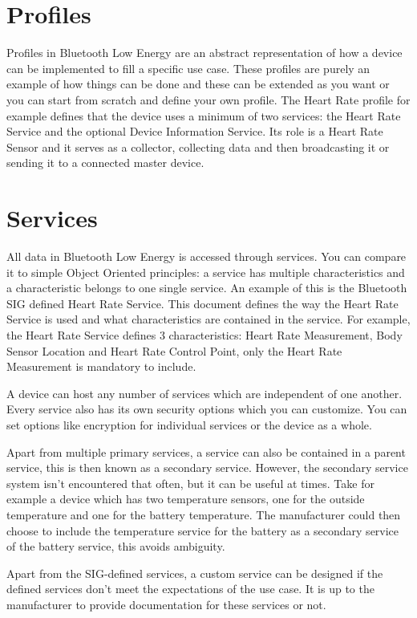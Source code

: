 \documentclass[pdftex,a4paper,12pt,twoside]{report}
\begin{document}
\section{Profiles}
\label{sec:profiles}
Profiles in Bluetooth Low Energy are an abstract representation of how a device can be implemented to fill a specific use case. These profiles are purely an example of how things can be done and these can be extended as you want or you can start from scratch and define your own profile. The Heart Rate profile for example defines that the device uses a minimum of two services: the Heart Rate Service and the optional Device Information Service. Its role is a Heart Rate Sensor and it serves as a collector, collecting data and then broadcasting it or sending it to a connected master device.

\section{Services}
\label{sec:services}
All data in Bluetooth Low Energy is accessed through services. You can compare it to simple Object Oriented principles: a service has multiple characteristics and a characteristic belongs to one single service. An example of this is the Bluetooth SIG defined Heart Rate Service. This document defines the way the Heart Rate Service is used and what characteristics are contained in the service. For example, the Heart Rate Service defines 3 characteristics: Heart Rate Measurement, Body Sensor Location and Heart Rate Control Point, only the Heart Rate Measurement is mandatory to include.

A device can host any number of services which are independent of one another. Every service also has its own security options which you can customize. You can set options like encryption for individual services or the device as a whole.

Apart from multiple primary services, a service can also be contained in a parent service, this is then known as a secondary service. However, the secondary service system isn't encountered that often, but it can be useful at times. Take for example a device which has two temperature sensors, one for the outside temperature and one for the battery temperature. The manufacturer could then choose to include the temperature service for the battery as a secondary service of the battery service, this avoids ambiguity.

Apart from the SIG-defined services, a custom service can be designed if the defined services don't meet the expectations of the use case. It is up to the manufacturer to provide documentation for these services or not.
\end{document}
